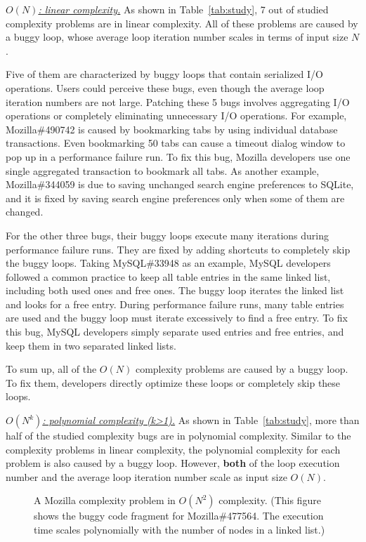 {\underline{\textit{$O(N)$: linear complexity.}}} 
As shown in Table~\ref{tab:study}, 
7 out of \ComBugs studied complexity problems are in linear complexity. 
All of these problems are caused by a buggy loop, 
whose average loop iteration number scales in terms of input size $N$.

Five of them are characterized by buggy loops that contain serialized I/O operations.
Users could perceive these bugs, 
even though the average loop iteration numbers are not large.
Patching these 5 bugs involves aggregating I/O operations 
or completely eliminating unnecessary I/O operations. 
For example, Mozilla\#490742 is caused by bookmarking 
tabs by using individual database transactions. 
Even bookmarking 50 tabs can cause a timeout dialog 
window to pop up in a performance failure run. 
To fix this bug, Mozilla developers use one single aggregated transaction 
to bookmark all tabs.
As another example, Mozilla\#344059 is due to saving unchanged 
search engine preferences to SQLite, 
and it is fixed by saving search 
engine preferences only when some of them are changed.

For the other three bugs,
their buggy loops execute many iterations during performance failure runs.
They are fixed by adding shortcuts to completely skip the buggy loops. 
Taking MySQL\#33948 as an example,
MySQL developers followed a common practice to keep all table entries in the same linked list, 
including both used ones and free ones. 
The buggy loop iterates the linked list and looks for a free entry.
During performance failure runs, 
many table entries are used and the buggy loop must iterate excessively to find a free entry.
To fix this bug, MySQL developers simply separate used entries and free entries,
and keep them in two separated linked lists. 

To sum up, all of the $O(N)$ complexity problems are caused by a buggy loop. 
To fix them, developers directly optimize these loops or completely skip these loops. 


{\underline{\textit{$O(N^k)$: polynomial complexity (k>1).}}}
As shown in Table~\ref{tab:study}, 
more than half of the studied complexity bugs are in polynomial complexity. 
Similar to the complexity problems in linear complexity,
the polynomial complexity for each problem is also caused by a buggy loop.
However, {\bf both} of the loop execution number 
and the average loop iteration number
scale as input size $O(N)$.


\begin{figure}
\centering
{}
  \mbox{}
  \vspace{-0.1in}
\caption{A Mozilla complexity problem in $O(N^2)$ complexity.
\footnotesize{(This figure shows the buggy code fragment for Mozilla\#477564. 
The execution time scales polynomially with the number of nodes in a linked list.)}}
\vspace{-0.05in}
\label{fig:Mozilla477564}
\vspace{-0.15in}
\end{figure}

